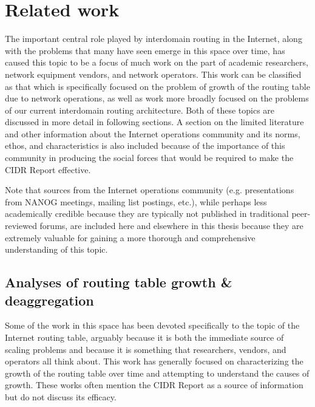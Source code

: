 \chapter{Related work}
\label{chap:relwork}

The important central role played by interdomain routing in the Internet, along
with the problems that many have seen emerge in this space over time, has
caused this topic to be a focus of much work on the part of academic
researchers, network equipment vendors, and network operators. This work can be
classified as that which is specifically focused on the problem of growth of
the routing table due to network operations, as well as work more broadly
focused on the problems of our current interdomain routing architecture. Both
of these topics are discussed in more detail in following sections. A section
on the limited literature and other information about the Internet operations
community and its norms, ethos, and characteristics is also included because of
the importance of this community in producing the social forces that would be
required to make the CIDR Report effective.

Note that sources from the Internet operations community (e.g. presentations
from NANOG meetings, mailing list postings, etc.), while perhaps less
academically credible because they are typically not published in traditional
peer-reviewed forums, are included here and elsewhere in this thesis because
they are extremely valuable for gaining a more thorough and comprehensive
understanding of this topic.


\section{Analyses of routing table growth \& deaggregation}

Some of the work in this space has been devoted specifically to the topic of
the Internet routing table, arguably because it is both the immediate source of
scaling problems and because it is something that researchers, vendors, and
operators all think about. This work has generally focused on characterizing
the growth of the routing table over time and attempting to understand the
causes of growth. These works often mention the CIDR Report as a source of
information but do not discuss its efficacy.

